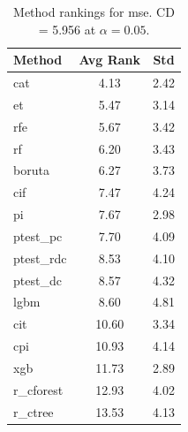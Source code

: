 \begin{table}[h]
\centering
\caption{Method rankings for mse. CD = 5.956 at $\alpha=0.05$.}
\label{tab:ranks_mse}
\begin{tabular}{lcc}
\toprule
Method & Avg Rank & Std \\
\midrule
cat & 4.13 & 2.42 \\
et & 5.47 & 3.14 \\
rfe & 5.67 & 3.42 \\
rf & 6.20 & 3.43 \\
boruta & 6.27 & 3.73 \\
cif & 7.47 & 4.24 \\
pi & 7.67 & 2.98 \\
ptest_pc & 7.70 & 4.09 \\
ptest_rdc & 8.53 & 4.10 \\
ptest_dc & 8.57 & 4.32 \\
lgbm & 8.60 & 4.81 \\
cit & 10.60 & 3.34 \\
cpi & 10.93 & 4.14 \\
xgb & 11.73 & 2.89 \\
r_cforest & 12.93 & 4.02 \\
r_ctree & 13.53 & 4.13 \\
\bottomrule
\end{tabular}
\end{table}